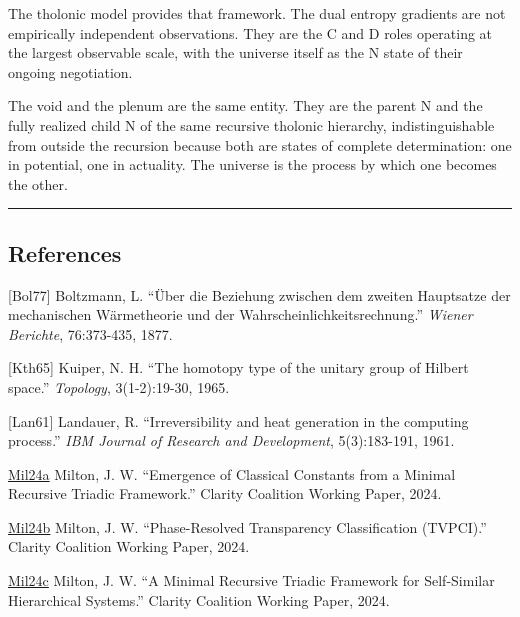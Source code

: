 \documentclass[
  11pt,
  letterpaper,
]{article}
\begin{document}
The tholonic model provides that framework. The dual entropy gradients
are not empirically independent observations. They are the C and D roles
operating at the largest observable scale, with the universe itself as
the N state of their ongoing negotiation.

The void and the plenum are the same entity. They are the parent N and
the fully realized child N of the same recursive tholonic hierarchy,
indistinguishable from outside the recursion because both are states of
complete determination: one in potential, one in actuality. The universe
is the process by which one becomes the other.

\begin{center}\rule{0.5\linewidth}{0.5pt}\end{center}

\subsection{References}\label{references}

{[}Bol77{]} Boltzmann, L. ``Über die Beziehung zwischen dem zweiten
Hauptsatze der mechanischen Wärmetheorie und der
Wahrscheinlichkeitsrechnung.'' \emph{Wiener Berichte}, 76:373-435, 1877.

{[}Kth65{]} Kuiper, N. H. ``The homotopy type of the unitary group of
Hilbert space.'' \emph{Topology}, 3(1-2):19-30, 1965.

{[}Lan61{]} Landauer, R. ``Irreversibility and heat generation in the
computing process.'' \emph{IBM Journal of Research and Development},
5(3):183-191, 1961.

\href{https://github.com/baardev/truevalue/blob/main/docnav/Research/papers/1_recursive-tholonic-five-constants/1_recursive-tholonic-five-constants.pdf}{Mil24a}
Milton, J. W. ``Emergence of Classical Constants from a Minimal
Recursive Triadic Framework.'' Clarity Coalition Working Paper, 2024.

\href{https://github.com/baardev/truevalue/blob/main/docnav/Research/papers/2_supply-chain-transparency-tvpci/2_supply-chain-transparency-tvpci.pdf}{Mil24b}
Milton, J. W. ``Phase-Resolved Transparency Classification (TVPCI).''
Clarity Coalition Working Paper, 2024.

\href{https://github.com/baardev/truevalue/blob/main/docnav/Research/papers/3_minimal-recursive-triadic-framework/3_minimal-recursive-triadic-framework.pdf}{Mil24c}
Milton, J. W. ``A Minimal Recursive Triadic Framework for Self-Similar
Hierarchical Systems.'' Clarity Coalition Working Paper, 2024.
\end{document}
